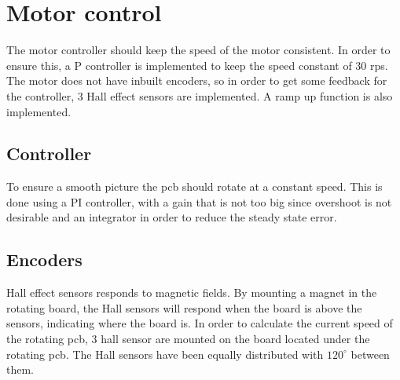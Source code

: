 \section{Motor control}
The motor controller should keep the speed of the motor consistent.
In order to ensure this, a P controller is implemented to keep the speed constant of 30 rps.
The motor does not have inbuilt encoders, so in order to get some feedback for the controller, 3 Hall effect sensors are implemented.
A ramp up function is also implemented.

\subsection{Controller}

To ensure a smooth picture the pcb should rotate at a constant speed.
This is done using a PI controller, with a gain that is not too big since overshoot is not desirable and an integrator in order to reduce the steady state error.

\subsection{Encoders} \label{sec:encoders}

Hall effect sensors responds to magnetic fields.
By mounting a magnet in the rotating board, the Hall sensors will respond when the board is above the sensors, indicating where the board is.
In order to calculate the current speed of the rotating pcb, 3 hall sensor are mounted on the board located under the rotating pcb.
The Hall sensors have been equally distributed with $120^{\circ}$ between them.

